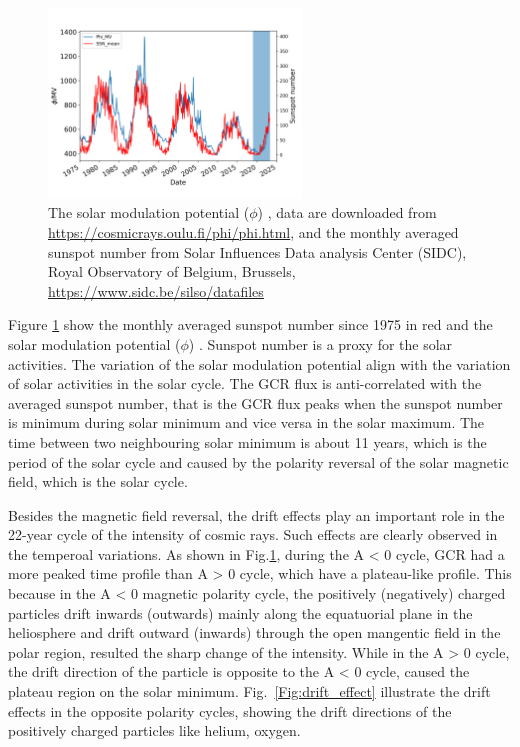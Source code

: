 \begin{figure}
	\centering
	\includegraphics[width = 0.6\textwidth]{images/Solar_modulation.png}
	\caption{The solar modulation potential ($\phi$) \cite{Usoskin 2011}, data are downloaded from \url{https://cosmicrays.oulu.fi/phi/phi.html}, and the monthly averaged sunspot number from Solar Influences Data analysis Center (SIDC), Royal Observatory of Belgium, Brussels, \url{https://www.sidc.be/silso/datafiles}}
	\label{Fig:Solar_modulation}
\end{figure}


Figure \ref{Fig:Solar_modulation} show the monthly averaged sunspot number since 1975 in red and the solar modulation potential ($\phi$) \cite{Usoskin 2011}.
Sunspot number is a proxy for the solar activities. The variation of the solar modulation potential align with the variation of solar activities in the solar cycle.
The GCR flux is anti-correlated with the averaged sunspot number, that is the GCR flux peaks when the sunspot number is minimum during solar minimum and vice versa in the solar maximum.
The time between two neighbouring solar minimum is about 11 years, which is the period of the solar cycle and caused by the polarity reversal of the solar magnetic field, which is the solar cycle.

Besides the magnetic field reversal, the drift effects play an important role in the 22-year cycle of the intensity of cosmic rays. Such effects are clearly observed in the temperoal variations.
As shown in Fig.\ref{Fig:Solar_modulation}, during the A < 0 cycle, GCR had a more peaked time profile than A > 0 cycle, which have a plateau-like profile. 
This because in the A < 0 magnetic polarity cycle, the positively (negatively) charged particles drift inwards (outwards) mainly along the equatuorial plane in the heliosphere and drift outward (inwards) through the open mangentic field in the polar region, resulted the sharp change of the intensity. While in the A > 0 cycle, the drift direction of the particle is opposite to the A < 0 cycle, caused the plateau region on the solar minimum. Fig.~\ref{Fig:drift_effect} illustrate the drift effects in the opposite polarity cycles, showing the drift directions of the positively charged particles like helium, oxygen.

